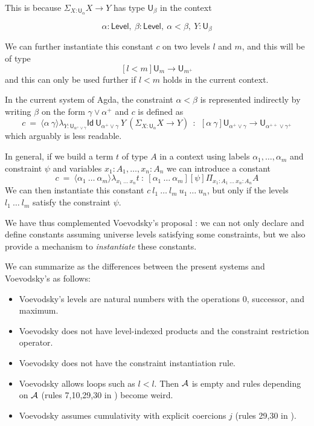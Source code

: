 \documentclass[11pt,a4paper]{article}
\theoremstyle{definition}
\newcommand{\lam}[1]{{\langle}#1{\rangle}}
\newcommand{\Id}{\mathsf{Id}}
\newcommand{\UU}{\mathsf{U}}
\newcommand{\Level}{\mathsf{Level}}
\begin{document}
   This is because $\Sigma_{X:\UU_{\alpha}}X\rightarrow Y$ has type $\UU_{\beta}$ in the context

   $$\alpha:\Level,~\beta:\Level,~\alpha<\beta,~Y:\UU_{\beta}$$

   We can further instantiate this constant $c$ on two levels $l$ and $m$, and this will be of type
   $$[l<m]\UU_{m} \rightarrow \UU_{m^+}$$
   and this can only be used further if $l<m$ holds in the current context.

   \medskip


In the current system of Agda, the constraint $\alpha<\beta$ is represented indirectly by
writing $\beta$ on the form $\gamma\vee \alpha^+$ and $c$ is defined as
$$
c~=~\lam{\alpha~\gamma}\lambda_{Y:\UU_{\alpha^+\vee\gamma}}\Id~{\UU_{\alpha^+\vee\gamma}}~Y~ (\Sigma_{X:\UU_{\alpha}}X\rightarrow Y)~~:~~
   [\alpha~\gamma]\UU_{\alpha^+\vee\gamma} \rightarrow \UU_{\alpha^{++}\vee\gamma^+}
$$
   which arguably is less readable.

\medskip

In general, if we  build a term $t$ of type $A$ in a context using labels $\alpha_1,\dots,\alpha_m$
and constraint $\psi$ and variables $x_1:A_1,\dots,x_n:A_n$ we can introduce a constant
$$
c~=~ \lam{\alpha_1~\dots~\alpha_m}\lambda_{x_1~\dots~x_n}t ~:~
[\alpha_1~\dots~\alpha_m][\psi]\Pi_{x_1:A_1~\dots~x_n:A_n}A
$$
We can then instantiate this constant $c~l_1~\dots~l_m~u_1~\dots~u_n$, but only if the levels
$l_1~\dots~l_m$ satisfy the constraint $\psi$.

    We have thus complemented Voevodsky's proposal \cite{VV}: we can not only declare and define
    constants assuming universe levels satisfying some constraints, but we also provide a mechanism
    to {\em instantiate} these constants.

 We can summarize as the differences between the present systems and Voevodsky's as follows:
 \begin{itemize}
\item Voevodsky's levels are natural numbers with the operations $0$, successor, and maximum.
\item Voevodsky does not have level-indexed products and the constraint restriction operator.
\item Voevodsky does not have the constraint instantiation rule.
\item Voevodsky allows loops such as $l<l$. 
Then ${\cal A}$ is empty and rules depending on ${\cal A}$
(rules 7,10,29,30 in \cite[Sec. 3.4]{VV}) become weird.
\item Voevodsky assumes cumulativity with explicit coercions $j$
(rules 29,30 in \cite[Sec. 3.4]{VV}).
\end{itemize}
\end{document}
